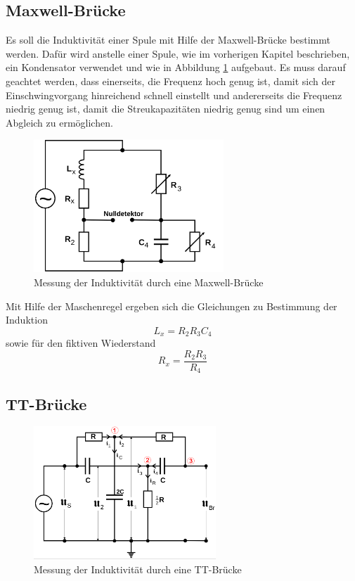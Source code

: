 \subsection{Maxwell-Brücke}
Es soll die Induktivität einer Spule mit Hilfe der Maxwell-Brücke bestimmt werden. Dafür wird anstelle einer Spule, wie im vorherigen Kapitel beschrieben, ein Kondensator verwendet und wie in Abbildung \ref{fig:Max-Br} aufgebaut. Es muss darauf geachtet werden, dass einerseits, die Frequenz hoch genug ist, damit sich der Einschwingvorgang hinreichend schnell einstellt und andererseits die Frequenz niedrig genug ist, damit die Streukapazitäten niedrig genug sind um einen Abgleich zu ermöglichen.
\begin{figure}
  \centering
  \includegraphics[height=5cm]{picture/5.png}
  \caption{Messung der Induktivität durch eine Maxwell-Brücke}
  \label{fig:Max-Br}
\end{figure}
Mit Hilfe der Maschenregel ergeben sich die Gleichungen zu Bestimmung der Induktion 
\begin{equation}
  L_x = R_2 R_3 C_4
  \label{eqn:L_x}
\end{equation}
sowie für den fiktiven Wiederstand
\begin{equation}
  R_x = \frac{R_2 R_3}{R_4}
  \label{eqn:R_M}
\end{equation}

\subsection{TT-Brücke}

\begin{figure}
  \centering
  \includegraphics[height=5cm]{picture/7.png}
  \caption{Messung der Induktivität durch eine TT-Brücke}
  \label{fig:TT}
\end{figure}

